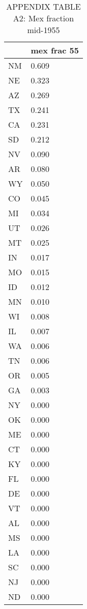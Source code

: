 \begin{table}[htbp]
\caption{\label{clabel} APPENDIX TABLE A2: Mex fraction mid-1955}\centering\medskip
\begin{tabular}{|l|l|}\hline  
 & mex frac 55  \\ \hline  
NM & 0.609 \\ \hline 
NE & 0.323 \\ \hline 
AZ & 0.269 \\ \hline 
TX & 0.241 \\ \hline 
CA & 0.231 \\ \hline 
SD & 0.212 \\ \hline 
NV & 0.090 \\ \hline 
AR & 0.080 \\ \hline 
WY & 0.050 \\ \hline 
CO & 0.045 \\ \hline 
MI & 0.034 \\ \hline 
UT & 0.026 \\ \hline 
MT & 0.025 \\ \hline 
IN & 0.017 \\ \hline 
MO & 0.015 \\ \hline 
ID & 0.012 \\ \hline 
MN & 0.010 \\ \hline 
WI & 0.008 \\ \hline 
IL & 0.007 \\ \hline 
WA & 0.006 \\ \hline 
TN & 0.006 \\ \hline 
OR & 0.005 \\ \hline 
GA & 0.003 \\ \hline 
NY & 0.000 \\ \hline 
OK & 0.000 \\ \hline 
ME & 0.000 \\ \hline 
CT & 0.000 \\ \hline 
KY & 0.000 \\ \hline 
FL & 0.000 \\ \hline 
DE & 0.000 \\ \hline 
VT & 0.000 \\ \hline 
AL & 0.000 \\ \hline 
MS & 0.000 \\ \hline 
LA & 0.000 \\ \hline 
SC & 0.000 \\ \hline 
NJ & 0.000 \\ \hline 
ND & 0.000 \\ \hline 

\end{tabular}
\end{table}
